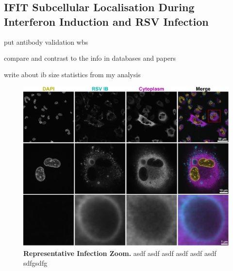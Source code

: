 \subsection{IFIT Subcellular Localisation During Interferon Induction and RSV Infection} \label{subsec:IFIT Subcellular Localisation During Interferon INduction and RSV Infection}
put antibody validation wbs

compare and contrast to the info in databases and papers

write about ib size statistics from my analysis


\begin{figure}
    \centering
    \includegraphics[width=1\linewidth]{09. Chapter 4/Figs/01. Localisation introduction/01. IB-zooms.pdf}
    \caption[Representative Infection Zoom.]{\textbf{Representative Infection Zoom.} asdf asdf asdf asdf asdf asdf sdfgsdfg}
    \label{fig:Representative Infection Zoom}
\end{figure}


